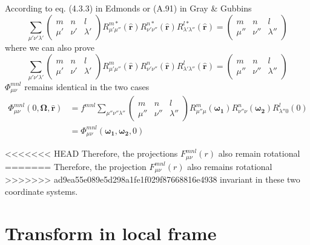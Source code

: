 According to eq. (4.3.3) in Edmonds \citep{Edmonds} or (A.91) in
Gray & Gubbins \citep{Gray-Gubbins}
\begin{equation}
\sum_{\mu'\nu'\lambda'}\left(\begin{array}{ccc}
m & n & l\\
\mu' & \nu' & \lambda'
\end{array}\right)R_{\mu'\mu''}^{m*}(\mathbf{\hat{r}})R_{\nu'\nu''}^{n*}(\mathbf{\hat{r}})R_{\lambda'\lambda''}^{l*}(\mathbf{\hat{r}})=\left(\begin{array}{ccc}
m & n & l\\
\mu'' & \nu'' & \lambda''
\end{array}\right)
\end{equation}
where we can also prove
\begin{equation}
\sum_{\mu'\nu'\lambda'}\left(\begin{array}{ccc}
m & n & l\\
\mu' & \nu' & \lambda'
\end{array}\right)R_{\mu'\mu''}^{m}(\mathbf{\hat{r}})R_{\nu'\nu''}^{n}(\mathbf{\hat{r}})R_{\lambda'\lambda''}^{l}(\mathbf{\hat{r}})=\left(\begin{array}{ccc}
m & n & l\\
\mu'' & \nu'' & \lambda''
\end{array}\right)
\end{equation}
$\Phi_{\mu\nu}^{mnl}$ remains identical in the two cases
\begin{align}
\Phi_{\mu\nu}^{mnl}(0,\mathbf{\Omega},\mathbf{\hat{r}}) & =f^{mnl}\sum_{\mu''\nu''\lambda''}\left(\begin{array}{ccc}
m & n & l\\
\mu'' & \nu'' & \lambda''
\end{array}\right)R_{\mu''\mu}^{m}(\boldsymbol{\omega_{1}})R_{\nu''\nu}^{n}(\boldsymbol{\omega_{2}})R_{\lambda''0}^{l}(0)\nonumber \\
 & =\Phi_{\mu\nu}^{mnl}(\boldsymbol{\omega_{1}},\boldsymbol{\omega_{2}},0)
\end{align}


<<<<<<< HEAD
Therefore, the projections $F_{\mu\nu}^{mnl}(r)$ also remain rotational
=======
Therefore, the projection $F_{\mu\nu}^{mnl}(r)$ also remains rotational
>>>>>>> ad9ea55e089e5d298a1fe1f029f87668816e4938
invariant in these two coordinate systems.


\section{Transform in local frame}

